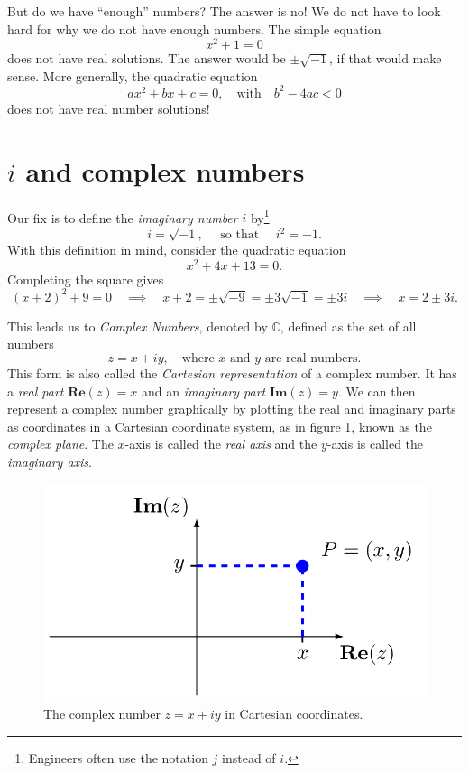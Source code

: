 \documentclass[
]{book}
\theoremstyle{definition}
\theoremstyle{definition}
\theoremstyle{definition}
\theoremstyle{definition}
\theoremstyle{remark}
\begin{document}
But do we have ``enough'' numbers? The answer is no! We do not have to look hard for why we do not have enough numbers. The simple equation
\[
x^2 + 1 = 0
\]
does not have real solutions. The answer would be \(\pm \sqrt{-1}\), if that would make sense. More generally, the quadratic equation
\[
a x^2 + b x + c = 0, \quad \text{with}\quad b^2 - 4 ac < 0
\]
does not have real number solutions!

\hypertarget{i-and-complex-numbers}{%
\section{\texorpdfstring{\(i\) and complex numbers}{i and complex numbers}}\label{i-and-complex-numbers}}

Our fix is to define the \emph{imaginary number} \(i\) by\footnote{Engineers often use the notation \(j\) instead of \(i\).}
\[
i = \sqrt{-1},\quad \text{ so that }\quad i^2 = -1.
\]
With this definition in mind, consider the quadratic equation
\[
x^2 + 4 x + 13 = 0.
\]
Completing the square gives
\[
(x+2)^2 + 9 = 0 \quad \implies \quad
x+2 = \pm \sqrt{-9} = \pm 3 \sqrt{-1} = \pm 3 i \quad \implies \quad
x = 2 \pm 3 i.
\]

This leads us to \emph{Complex Numbers}, denoted by \(\mathbb{C}\), defined as the set of all numbers
\[
z = x + i y, \quad \text{where $x$ and $y$ are real numbers}.
\]
This form is also called the \emph{Cartesian representation} of a complex number. It has a \emph{real part} \(\mathbf{Re}(z) = x\) and an \emph{imaginary part} \(\mathbf{Im}(z) = y\). We can then represent a complex number graphically by plotting the real and imaginary parts as coordinates in a Cartesian coordinate system, as in figure \ref{fig:complexcart}, known as the \emph{complex plane}. The \(x\)-axis is called the \emph{real axis} and the \(y\)-axis is called the \emph{imaginary axis}.

\begin{figure}
\includegraphics{figures/complexcart} \caption{The complex number $z = x + iy$ in Cartesian coordinates.}\label{fig:complexcart}
\end{figure}
\end{document}
